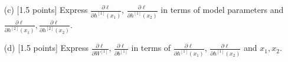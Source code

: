 \documentclass{article}
\newif\ifsolutions
\newenvironment{labelledanswer}{{\bf Answer:} \sf }{}%
\newcommand{\answer}[2]
{{
\ifsolutions
\begin{labelledanswer}
\color{red} 
#2
\end{labelledanswer}
\else
#1
\fi
}}
\begin{document}
\begin{itemize}
{    }
    
    \item [(c)] [1.5 points] Express $\frac{\partial \ell}{\partial h^{[1]}(x_1)}$, $\frac{\partial \ell}{\partial h^{[1]}(x_2)}$ in terms of model parameters and $\frac{\partial \ell}{\partial h^{[2]}(x_1)}, \frac{\partial \ell}{\partial h^{[2]}(x_2)}$.
    
    \answer{}{
$$
\frac{\partial \ell}{\partial h^{[1]}(x_1)} 
= 
\frac{\partial \ell}{\partial h^{[2]}(x_1)} 
\frac{\partial h^{[2]}(x_1)}{\partial a^{[1]}(x_1)}
\frac{\partial a^{[1]}(x_1)}{\partial h^{[1]}(x_1)} 
$$
$$
= 
\frac{\partial \ell}{\partial h^{[2]}(x_1)} 
\frac{\partial}{\partial a^{[1]}(x_1)} (W^{[2]}a^{[1]}(x_1) + b^{[2]})
\frac{\partial}{\partial h^{[1]}(x_1)} \sigma(h^{[1]}(x_1))
$$
$$
= 
\frac{\partial \ell}{\partial h^{[2]}(x_1)} (W^{[2]}) (\sigma(h^{[1]}(x_1)))(1-\sigma(h^{[1]}(x_1)))
$$    
$$
= 
\frac{\partial \ell}{\partial h^{[2]}(x_1)} (W^{[2]}) (\sigma( W^{[1]}x_1 + b^{[1]}))(1-\sigma( W^{[1]}x_1 + b^{[1]}))
$$
    
$$
\frac{\partial \ell}{\partial h^{[1]}(x_2)}
$$
$$
= 
\frac{\partial \ell}{\partial h^{[2]}(x_2)} 
\frac{\partial h^{[2]}(x_2)}{\partial a^{[1]}(x_2)}
\frac{\partial a^{[1]}(x_2)}{\partial h^{[1]}(x_2)} 
$$
$$
= 
\frac{\partial \ell}{\partial h^{[2]}(x_2)} 
\frac{\partial}{\partial a^{[1]}(x_2)} (W^{[2]}a^{[1]}(x_2) + b^{[2]})
\frac{\partial}{\partial h^{[1]}(x_2)} \sigma(h^{[1]}(x_2))
$$
$$
= 
\frac{\partial \ell}{\partial h^{[2]}(x_2)} (W^{[2]}) (\sigma(h^{[1]}(x_2)))(1-\sigma(h^{[1]}(x_2)))
$$    
$$
= 
\frac{\partial \ell}{\partial h^{[2]}(x_2)} (W^{[2]}) (\sigma( W^{[1]}x_2 + b^{[1]}))(1-\sigma( W^{[1]}x_2 + b^{[1]}))
$$

    }
    
    \item [(d)] [1.5 points] Express $\frac{\partial \ell}{\partial W^{[1]}}$, $\frac{\partial \ell}{\partial b^{[1]}}$ in terms of $\frac{\partial \ell}{\partial h^{[1]}(x_1)}$, $\frac{\partial \ell}{\partial h^{[1]}(x_2)}$ and $x_1, x_2$.
    

\end{itemize}
\end{document}
